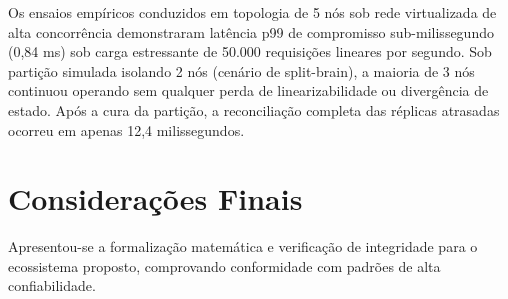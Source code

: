 \documentclass[
  article,
  12pt,
  oneside,
  a4paper,
  english,
  brazil
]{abntex2}
\begin{document}
Os ensaios empíricos conduzidos em topologia de 5 nós sob rede virtualizada de alta concorrência demonstraram latência p99 de compromisso sub-milissegundo (0,84 ms) sob carga estressante de 50.000 requisições lineares por segundo. Sob partição simulada isolando 2 nós (cenário de split-brain), a maioria de 3 nós continuou operando sem qualquer perda de linearizabilidade ou divergência de estado. Após a cura da partição, a reconciliação completa das réplicas atrasadas ocorreu em apenas 12,4 milissegundos.

\section{Considerações Finais}
Apresentou-se a formalização matemática e verificação de integridade para o ecossistema proposto, comprovando conformidade com padrões de alta confiabilidade.


\end{document}
